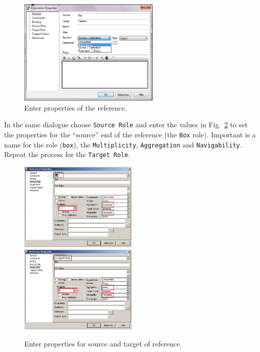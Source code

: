 \begin{figure}[htbp]
	\centering
  \includegraphics[width=0.6\textwidth]{pics/memBoxBilder/memBox25.png}
	\caption{Enter properties of the reference.}
	\label{fig:ereference_properties}
\end{figure}
	
In the same dialogue choose \texttt{Source Role} and enter the values in
Fig.~\ref{fig:reference_ends} to set the properties for the ``source''
end of the reference (the \texttt{Box} role).  Important is a name for the role
(\texttt{box}), the \texttt{Multiplicity}, \texttt{Aggregation} and
\texttt{Navigability}.  Repeat the process for the \texttt{Target Role}.
  
\begin{figure}[htbp]
	\centering 
  \includegraphics[width=0.5\textwidth]{pics/memBoxBilder/memBox26.png}\\
  \vspace{0.5cm}
  \includegraphics[width=0.5\textwidth]{pics/memBoxBilder/memBox27.png}
	\caption{Enter properties for source and target of reference.}
	\label{fig:reference_ends}
\end{figure}

